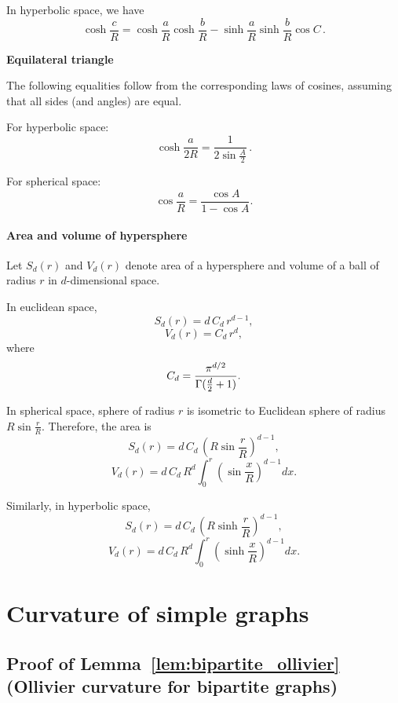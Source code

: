 \documentclass{article} %
\begin{document}
In hyperbolic space, we have 
\[
\cosh {\frac {c}{R}}= \cosh {\frac {a}{R}}\cosh {\frac {b}{R}}-\sinh {\frac {a}{R}}\sinh {\frac {b}{R}}\cos C \,.
\]

\textbf{Equilateral triangle}

The following equalities follow from the corresponding laws of cosines, assuming that all sides (and angles) are equal.

For hyperbolic space:
\begin{equation}\label{eq:hyp_eq}
\cosh\frac{a}{2R} = \frac{1}{2\sin \frac{A}{2}}\,.
\end{equation}

For spherical space:
\begin{equation}\label{eq:sph_eq}
\cos{\frac{a}{R}} = \frac{\cos A}{1 - \cos A}.
\end{equation}

\paragraph{Area and volume of hypersphere}

Let $S_d(r)$ and $V_d(r)$ denote area of a hypersphere and volume of a ball of radius $r$ in $d$-dimensional space. 

In euclidean space,
\[
S_d(r)= d \, C_{d} \, r^{d-1},
\]
\[
V_d(r)= C_{d} \, r^{d},
\]
where
\[
C_{d}={\frac  {\pi ^{{d/2}}}{\Gamma ({d \over 2}+1)}}.
\]

In spherical space, sphere of radius $r$ is isometric to Euclidean sphere of radius $R \sin \frac{r}{R}$. Therefore, the area is 
\[
S_d(r)= d \, C_{d} \, \left( R \sin \frac{r}{R} \right)^{d-1},
\]
\[
V_d(r)= d \, C_{d} \, R^d \int_{0}^{r} \left( \sin \frac{x}{R} \right)^{d-1} d x .
\]

Similarly, in hyperbolic space,
\[
S_d(r)= d \, C_{d} \, \left( R \sinh \frac{r}{R} \right)^{d-1},
\]
\[
V_d(r)= d \, C_{d} \, R^d \int_{0}^{r} \left( \sinh \frac{x}{R} \right)^{d-1} d x .
\]


\section{Curvature of simple graphs}

\subsection{Proof of Lemma~\ref{lem:bipartite_ollivier} (Ollivier curvature for bipartite graphs)}\label{app:bipartite_ollivier}
\end{document}
